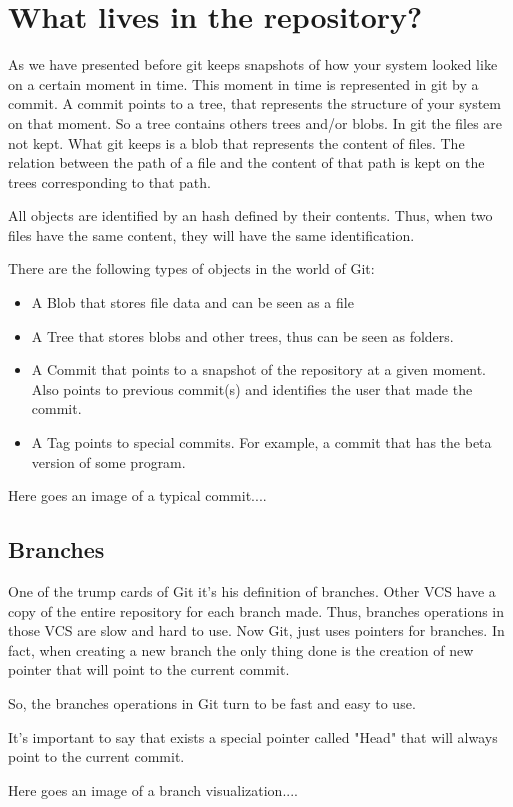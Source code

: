\section{What lives in the repository?}

As we have presented before git keeps snapshots of how your system
looked like on a certain moment in time. This moment in time is
represented in git by a commit. A commit points to a tree, that
represents the structure of your system on that moment. So a tree
contains others trees and/or blobs. In git the files are not kept. 
What git keeps is a blob that represents the content of files. The
relation between the path of a file and the content of that path 
is kept on the trees corresponding to that path. \par

All objects are identified by an hash 
defined by their contents. Thus, when two files have the same
content, they will have the same identification. \par

There are the following types of objects in the world of Git:

\begin{itemize}
\item A Blob that stores file data and can be seen as a file
\item A Tree that stores blobs and other trees, thus can be seen as folders.
\item A Commit that points to a snapshot of the repository at a given moment.
Also points to previous commit(s) and identifies the user that made the commit.
\item A Tag points to special commits. For example, a commit that has the beta
version of some program.
\end{itemize}

Here goes an image of a typical commit....

\subsection{Branches}
One of the trump cards of Git it's his definition of branches. Other VCS
have a copy of the entire repository for each branch made. Thus, branches
operations in those VCS are slow and hard to use. Now Git, just uses 
pointers for branches. In fact, when creating a new branch the only thing
done is the creation of new pointer that will point to the current commit. \par
So, the branches operations in Git turn to be fast and easy to use. \par
It's important to say that exists a special pointer called "Head" that will 
always point to the current commit. \par

Here goes an image of a branch visualization....

